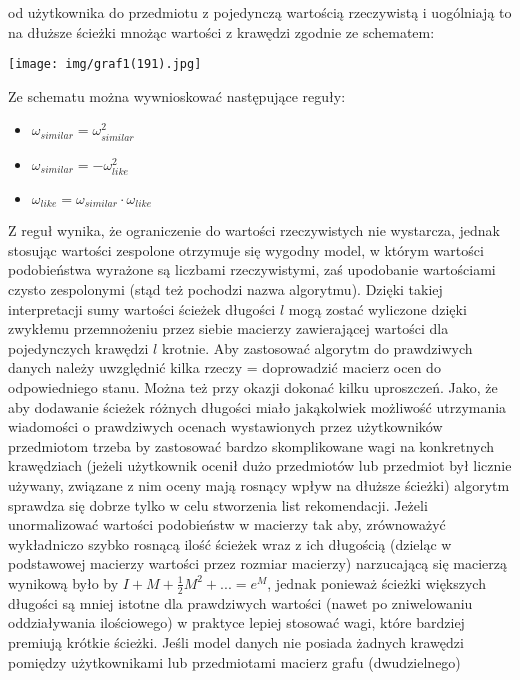\documentclass{pracamgr}
\begin{document}
    od użytkownika do przedmiotu z pojedynczą wartością rzeczywistą i uogólniają to na dłuższe ścieżki mnożąc wartości z krawędzi zgodnie ze schematem:
    \begin{center}
     \texttt{[image: img/graf1(191).jpg]}
    \end{center}
    Ze schematu można wywnioskować następujące reguły:
    \begin{itemize}\itemsep1pt \parskip0pt 
     \item $\omega_{similar}=\omega^2_{similar}$    
     \item $\omega_{similar}=-\omega^2_{like}$
     \item $\omega_{like}=\omega_{similar}\cdot\omega_{like}$
    \end{itemize}
    Z reguł wynika, że ograniczenie do wartości rzeczywistych nie wystarcza, jednak stosując wartości zespolone otrzymuje się wygodny model,
    w którym wartości podobieństwa wyrażone są liczbami rzeczywistymi, zaś upodobanie wartościami czysto zespolonymi (stąd też pochodzi nazwa algorytmu).
    Dzięki takiej interpretacji sumy wartości ścieżek długości $l$ mogą zostać wyliczone dzięki zwykłemu przemnożeniu przez siebie macierzy zawierającej
    wartości dla pojedynczych krawędzi $l$ krotnie.\newline
    Aby zastosować algorytm do prawdziwych danych należy uwzględnić kilka rzeczy = doprowadzić macierz ocen do odpowiedniego stanu.
    Można też przy okazji dokonać kilku uproszczeń.
    Jako, że aby dodawanie ścieżek różnych długości miało jakąkolwiek możliwość utrzymania wiadomości
    o prawdziwych ocenach wystawionych przez użytkowników przedmiotom trzeba by zastosować bardzo skomplikowane wagi na konkretnych krawędziach
    (jeżeli użytkownik ocenił dużo przedmiotów lub przedmiot był licznie używany, związane z nim oceny mają rosnący wpływ na dłuższe ścieżki)
    algorytm sprawdza się dobrze tylko w celu stworzenia list rekomendacji.
    Jeżeli unormalizować wartości podobieństw w macierzy tak aby, zrównoważyć wykładniczo szybko rosnącą ilość ścieżek wraz z ich długością
    (dzieląc w podstawowej macierzy wartości przez rozmiar macierzy) narzucającą się macierzą wynikową było by $I+M+\frac{1}{2}M^2+...=e^{M}$,
    jednak ponieważ ścieżki większych długości są mniej istotne dla prawdziwych wartości (nawet po zniwelowaniu oddziaływania ilościowego)
    w praktyce lepiej stosować wagi, które bardziej premiują krótkie ścieżki.
    Jeśli model danych nie posiada żadnych krawędzi pomiędzy użytkownikami lub przedmiotami macierz grafu (dwudzielnego)
\end{document}
